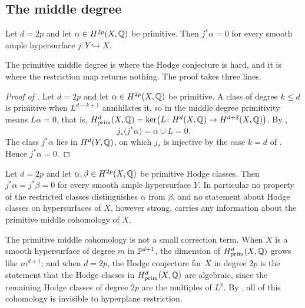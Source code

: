 \subsection{The middle degree}

\begin{theorem}\label{thm:hyperplane}
Let $d=2p$ and let $\alpha\in H^{2p}(X,\mathbb{Q})$ be primitive. Then
$j^{*}\alpha=0$ for every smooth ample hypersurface $j\colon Y\hookrightarrow X$.
\end{theorem}

The primitive middle degree is where the Hodge conjecture is hard, and it is
where the restriction map returns nothing. The proof takes three lines.

\begin{proof}[Proof of ]
Let $d=2p$ and let $\alpha\in H^{2p}(X,\mathbb{Q})$ be primitive. A class of degree
$k\le d$ is primitive when $L^{d-k+1}$ annihilates it, so in the middle degree
primitivity means $L\alpha=0$, that is,
$H^{d}_{\mathrm{prim}}(X,\mathbb{Q})=\ker\bigl(L\colon H^{d}(X,\mathbb{Q})\to H^{d+2}(X,\mathbb{Q})\bigr)$.
By ,
\[
  j_{*}\bigl(j^{*}\alpha\bigr)=\alpha\cup L=0 .
\]
The class $j^{*}\alpha$ lies in $H^{d}(Y,\mathbb{Q})$, on which $j_{*}$ is injective
by the case $k=d$ of . Hence $j^{*}\alpha=0$.
\end{proof}

\begin{corollary}\label{cor:blind}
Let $d=2p$ and let $\alpha,\beta\in H^{2p}(X,\mathbb{Q})$ be primitive Hodge classes.
Then $j^{*}\alpha=j^{*}\beta=0$ for every smooth ample hypersurface $Y$. In
particular no property of the restricted classes distinguishes $\alpha$ from
$\beta$, and no statement about Hodge classes on hypersurfaces of $X$, however
strong, carries any information about the primitive middle cohomology of $X$.
\end{corollary}

\begin{remark}\label{rem:sizeofloss}
The primitive middle cohomology is not a small correction term. When $X$ is
a smooth hypersurface of degree $m$ in $\mathbb{P}^{d+1}$, the dimension of
$H^{d}_{\mathrm{prim}}(X,\mathbb{Q})$ grows like $m^{d+1}$; and when $d=2p$, the
Hodge conjecture for $X$ in degree $2p$ is the statement that the Hodge
classes in $H^{d}_{\mathrm{prim}}(X,\mathbb{Q})$ are algebraic, since the remaining
Hodge classes of degree $2p$ are the multiples of $L^{p}$. By
, all of this cohomology is invisible to hyperplane
restriction.
\end{remark}

